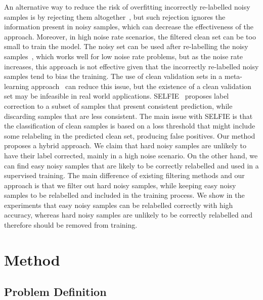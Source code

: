 \documentclass{bmvc2k}
\begin{document}
An alternative way to reduce the risk of overfitting incorrectly re-labelled noisy samples is by rejecting them altogether~\citep{han2018co,pleiss2020identifying}, but such rejection ignores the information present in noisy samples, which can decrease the effectiveness of the approach. Moreover, in high noise rate scenarios, the filtered clean set can be too small to train the model. 
The noisy set can be used after re-labelling the noisy samples~\citep{proselflc,DivideMix,ortego2019towards}, which works well for low noise rate problems, but as the noise rate increases, this approach is not effective given that the incorrectly re-labelled noisy samples tend to bias the training.
The use of clean validation sets in a meta-learning approach~\citep{algan2021meta} can reduce this issue, but the existence of a clean validation set may be infeasible in real world applications.
SELFIE~\citep{selfie} proposes label correction to a subset of samples that present consistent prediction, while discarding samples that are less consistent. The main issue with SELFIE is that the classification of clean samples is based on a loss threshold that might include some relabeling in the predicted clean set, 
producing false positives. Our method proposes a hybrid approach. We claim that hard noisy samples are unlikely to have their label corrected, mainly in a high noise scenario. On the other hand, we can find easy noisy samples that are likely to be correctly relabelled and used in a supervised training. The main difference of existing filtering methods and our approach is that we filter out hard noisy samples, while keeping easy noisy samples to be relabelled and included in the training process. We show in the experiments that easy noisy samples can be relabelled correctly with high accuracy, whereas hard noisy samples are unlikely to be correctly relabelled and therefore should be removed from training.

\vspace{-.1in}

\section{Method}



\subsection{Problem Definition}
\label{sec:problem_definition}
\end{document}
